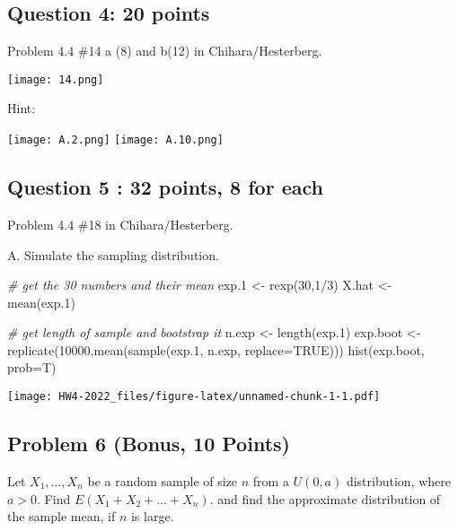 \documentclass[
]{article}
\newenvironment{Shaded}{\begin{snugshade}}{\end{snugshade}}
\newcommand{\AttributeTok}[1]{\textcolor[rgb]{0.77,0.63,0.00}{#1}}
\newcommand{\CommentTok}[1]{\textcolor[rgb]{0.56,0.35,0.01}{\textit{#1}}}
\newcommand{\ConstantTok}[1]{\textcolor[rgb]{0.00,0.00,0.00}{#1}}
\newcommand{\DecValTok}[1]{\textcolor[rgb]{0.00,0.00,0.81}{#1}}
\newcommand{\FloatTok}[1]{\textcolor[rgb]{0.00,0.00,0.81}{#1}}
\newcommand{\FunctionTok}[1]{\textcolor[rgb]{0.00,0.00,0.00}{#1}}
\newcommand{\NormalTok}[1]{#1}
\newcommand{\OtherTok}[1]{\textcolor[rgb]{0.56,0.35,0.01}{#1}}
\newcommand{\SpecialCharTok}[1]{\textcolor[rgb]{0.00,0.00,0.00}{#1}}
\begin{document}
\hypertarget{question-4-20-points}{%
\subsection{Question 4: 20 points}\label{question-4-20-points}}

Problem 4.4 \#14 a (8) and b(12) in Chihara/Hesterberg.

\texttt{[image: 14.png]}

Hint:

\texttt{[image: A.2.png]} \texttt{[image: A.10.png]}

\hypertarget{question-5-32-points-8-for-each}{%
\subsection{Question 5 : 32 points, 8 for
each}\label{question-5-32-points-8-for-each}}

Problem 4.4 \#18 in Chihara/Hesterberg.

A. Simulate the sampling distribution.

\begin{Shaded}
\begin{Highlighting}[]
\CommentTok{\# get the 30 numbers and their mean}
\NormalTok{exp}\FloatTok{.1} \OtherTok{\textless{}{-}} \FunctionTok{rexp}\NormalTok{(}\DecValTok{30}\NormalTok{,}\DecValTok{1}\SpecialCharTok{/}\DecValTok{3}\NormalTok{)}
\NormalTok{X.hat }\OtherTok{\textless{}{-}} \FunctionTok{mean}\NormalTok{(exp}\FloatTok{.1}\NormalTok{)}

\CommentTok{\# get length of sample and bootstrap it}
\NormalTok{n.exp }\OtherTok{\textless{}{-}} \FunctionTok{length}\NormalTok{(exp}\FloatTok{.1}\NormalTok{)}
\NormalTok{exp.boot }\OtherTok{\textless{}{-}} \FunctionTok{replicate}\NormalTok{(}\DecValTok{10000}\NormalTok{,}\FunctionTok{mean}\NormalTok{(}\FunctionTok{sample}\NormalTok{(exp}\FloatTok{.1}\NormalTok{, n.exp, }\AttributeTok{replace=}\ConstantTok{TRUE}\NormalTok{)))}
\FunctionTok{hist}\NormalTok{(exp.boot, }\AttributeTok{prob=}\NormalTok{T)}
\end{Highlighting}
\end{Shaded}

\texttt{[image: HW4-2022\_files/figure-latex/unnamed-chunk-1-1.pdf]}

\hypertarget{problem-6-bonus-10-points}{%
\subsection{Problem 6 (Bonus, 10
Points)}\label{problem-6-bonus-10-points}}

Let \(X_1, \dots, X_n\) be a random sample of size \(n\) from a
\(U(0,a)\) distribution, where \(a > 0\). Find
\(E(X_1+X_2+ \dots + X_n)\). and find the approximate distribution of
the sample mean, if \(n\) is large.
\end{document}
